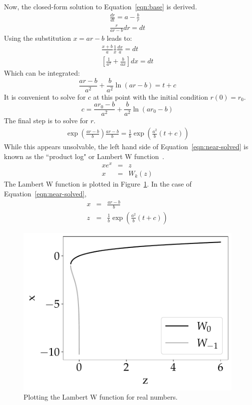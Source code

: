 \documentclass[journal]{IEEEtran}
\begin{document}
Now, the closed-form solution to Equation~\ref{eqn:base} is derived.
\begin{eqnarray}
  \frac{dr}{dt} = a - \frac{b}{r} \\
  \frac{r}{ar - b} dr = dt
\end{eqnarray}
Using the substitution $x = ar-b$ leads to:
\begin{eqnarray}
  \frac{x+b}{a}\frac{1}{x} \frac{dx}{a} = dt \\
  \left[\frac{1}{a^2} + \frac{b}{ax}\right] dx = dt
\end{eqnarray}
Which can be integrated:
\begin{equation}
  \frac{ar-b}{a^2} + \frac{b}{a^2}\ln\left(ar-b\right) = t + c
\end{equation}
It is convenient to solve for $c$ at this point with the initial condition $r(0) = r_0$.
\begin{equation}
  c = \frac{ar_0-b}{a^2} + \frac{b}{a^2}\ln\left(ar_0 - b\right)
\end{equation}
The final step is to solve for $r$.
\begin{eqnarray}
  \label{eqn:near-solved}
  \exp\left( \frac{ar-b}{b}\right) \frac{ar-b}{b} = \frac{1}{b}\exp\left(\frac{a^2}{b}(t+c)\right)
\end{eqnarray}
While this appears unsolvable, the left hand side of Equation~\ref{eqn:near-solved} is known as the ``product log" or Lambert W function~\cite{lambert1758observationes,weisstein2002lambert}.
\begin{eqnarray}
  xe^x &=& z \\
  x &=& W_k(z)
\end{eqnarray}
The Lambert W function is plotted in Figure~\ref{fig:w}.
In the case of Equation~\ref{eqn:near-solved},
\begin{eqnarray}
  \label{eqn:x}
  x &=& \frac{ar-b}{b} \\
  z &=& \frac{1}{b} \exp\left(\frac{a^2}{b}(t+c)\right)
\end{eqnarray}

\begin{figure}[b]
  \centering
    \includegraphics[width=0.9\linewidth]{w}%
  \caption{Plotting the Lambert W function for real numbers.}
  \label{fig:w}
\end{figure}
\end{document}
